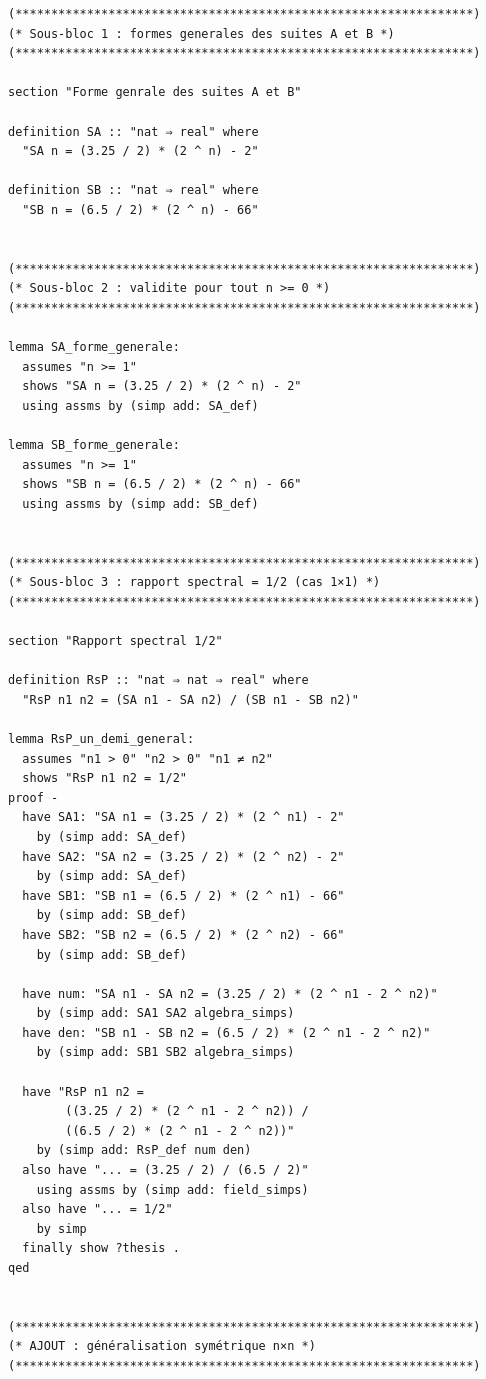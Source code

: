 \documentclass[a4paper,11pt]{article}
\begin{document}
\begin{holcode}[title={\textcolor{white}{File: methode\_spectral.thy -- Part 1/4}}]
\begin{lstlisting}
(****************************************************************)
(* Sous-bloc 1 : formes generales des suites A et B *)
(****************************************************************)

section "Forme genrale des suites A et B"

definition SA :: "nat ⇒ real" where
  "SA n = (3.25 / 2) * (2 ^ n) - 2"

definition SB :: "nat ⇒ real" where
  "SB n = (6.5 / 2) * (2 ^ n) - 66"


(****************************************************************)
(* Sous-bloc 2 : validite pour tout n >= 0 *)
(****************************************************************)

lemma SA_forme_generale:
  assumes "n >= 1"
  shows "SA n = (3.25 / 2) * (2 ^ n) - 2"
  using assms by (simp add: SA_def)

lemma SB_forme_generale:
  assumes "n >= 1"
  shows "SB n = (6.5 / 2) * (2 ^ n) - 66"
  using assms by (simp add: SB_def)


(****************************************************************)
(* Sous-bloc 3 : rapport spectral = 1/2 (cas 1×1) *)
(****************************************************************)

section "Rapport spectral 1/2"

definition RsP :: "nat ⇒ nat ⇒ real" where
  "RsP n1 n2 = (SA n1 - SA n2) / (SB n1 - SB n2)"

lemma RsP_un_demi_general:
  assumes "n1 > 0" "n2 > 0" "n1 ≠ n2"
  shows "RsP n1 n2 = 1/2"
proof -
  have SA1: "SA n1 = (3.25 / 2) * (2 ^ n1) - 2"
    by (simp add: SA_def)
  have SA2: "SA n2 = (3.25 / 2) * (2 ^ n2) - 2"
    by (simp add: SA_def)
  have SB1: "SB n1 = (6.5 / 2) * (2 ^ n1) - 66"
    by (simp add: SB_def)
  have SB2: "SB n2 = (6.5 / 2) * (2 ^ n2) - 66"
    by (simp add: SB_def)

  have num: "SA n1 - SA n2 = (3.25 / 2) * (2 ^ n1 - 2 ^ n2)"
    by (simp add: SA1 SA2 algebra_simps)
  have den: "SB n1 - SB n2 = (6.5 / 2) * (2 ^ n1 - 2 ^ n2)"
    by (simp add: SB1 SB2 algebra_simps)

  have "RsP n1 n2 =
        ((3.25 / 2) * (2 ^ n1 - 2 ^ n2)) /
        ((6.5 / 2) * (2 ^ n1 - 2 ^ n2))"
    by (simp add: RsP_def num den)
  also have "... = (3.25 / 2) / (6.5 / 2)"
    using assms by (simp add: field_simps)
  also have "... = 1/2"
    by simp
  finally show ?thesis .
qed


(****************************************************************)
(* AJOUT : généralisation symétrique n×n *)
(****************************************************************)


\end{lstlisting}
\end{holcode}
\end{document}
